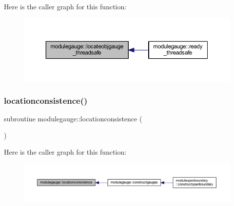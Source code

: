 Here is the caller graph for this function\+:\nopagebreak
\begin{figure}[H]
\begin{center}
\leavevmode
\includegraphics[width=350pt]{namespacemodulegauge_a40155a54ed9673433a35e0eb72673928_icgraph}
\end{center}
\end{figure}
\mbox{\label{namespacemodulegauge_a3c28cc048b2b01fde65fb7a5fc9f7213}} 
\subsubsection{\texorpdfstring{locationconsistence()}{locationconsistence()}}
{\footnotesize\ttfamily subroutine modulegauge\+::locationconsistence (\begin{DoxyParamCaption}{ }\end{DoxyParamCaption})\hspace{0.3cm}{\ttfamily [private]}}

Here is the caller graph for this function\+:\nopagebreak
\begin{figure}[H]
\begin{center}
\leavevmode
\includegraphics[width=350pt]{namespacemodulegauge_a3c28cc048b2b01fde65fb7a5fc9f7213_icgraph}
\end{center}
\end{figure}
\mbox{\label{namespacemodulegauge_a595eb00804040bb46c4684d46b5ed2eb}} 
